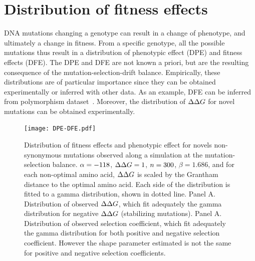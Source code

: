 \section{Distribution of fitness effects}
\label{sec:distribution-of-fitness-effects}

DNA mutations changing a genotype can result in a change of phenotype, and ultimately a change in fitness.
From a specific genotype, all the possible mutations thus result in a distribution of phenotypic effect (DPE) and fitness effects (\acrshort{DFE}).
The DPE and \acrshort{DFE} are not known a priori, but are the resulting consequence of the mutation-selection-drift balance.
Empirically, these distributions are of particular importance since they can be obtained experimentally or inferred with other data.
As an example, \acrshort{DFE} can be inferred from polymorphism dataset~\citep{Eyre-walker2007, Galtier2016}.
Moreover, the distribution of $\Delta \Delta G$ for novel mutations can be obtained experimentally.

\begin{figure}[H]
    \centering
    \texttt{[image: DPE-DFE.pdf]}
    \caption[Distribution of fitness effects and phenotypic effect]{
    Distribution of fitness effects and phenotypic effect for novels non-synonymous mutations observed along a simulation at the mutation-selection balance.
    $\alpha=-118$, $\Delta \Delta G=1$, $n=300$, $\beta=1.686$, and for each non-optimal amino acid, $\Delta \Delta G$ is scaled by the Grantham distance to the optimal amino acid.
    Each side of the distribution is fitted to a gamma distribution, shown in dotted line.
    Panel A. Distribution of observed $\Delta \Delta G$, which fit adequately the gamma distribution for negative $\Delta \Delta G$ (stabilizing mutations).
    Panel A. Distribution of observed selection coefficient, which fit adequately the gamma distribution for both positive and negative selection coefficient. However the shape parameter estimated is not the same for positive and negative selection coefficients.
    }
\end{figure}